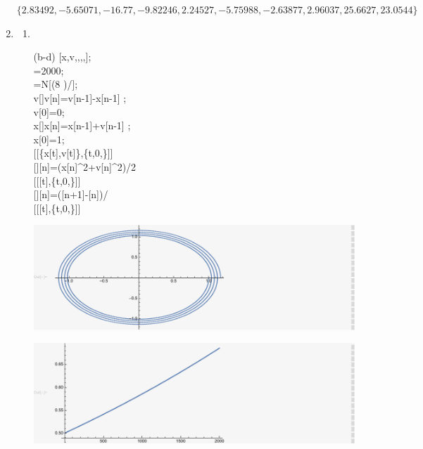 \documentclass[12pt]{article}
\begin{document}
\begin{enumerate}
        \begin{doublespace}
            \noindent\(\{2.83492,-5.65071,-16.77,-9.82246,2.24527,-5.75988,-2.63877,2.96037,25.6627,23.0544\}\)
        \end{doublespace}
        \item
        \begin{enumerate}
            \item
            \item[(b-d)]
            [x,v,,,,];\\
            =2000;\\
            =N[(8 )/];\\
            v[]\text{:=}v[n]=v[n-1]-x[n-1] ;\\
            v[0]=0;\\
            x[]\text{:=}x[n]=x[n-1]+v[n-1] ;\\
            x[0]=1;\\
            [[\{x[t],v[t]\},\{t,0,\}]]\\
            []\text{:=}[n]=(x[n]{}^{\wedge}2+v[n]{}^{\wedge}2)/2\\
            [[[t],\{t,0,\}]]\\
            []\text{:=}[n]=([n+1]-[n])/\\
            [[[t],\{t,0,\}]]

            \includegraphics{HW_6_screenshots/q_5_gr1}

            \includegraphics{HW_6_screenshots/q_5_gr2}


\end{enumerate}
\end{enumerate}
\end{document}
